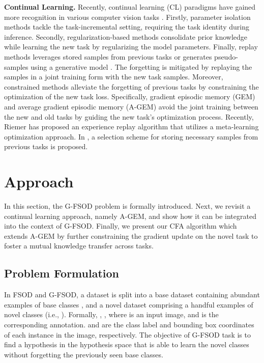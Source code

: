 \documentclass[10pt,twocolumn,letterpaper]{article}
\begin{document}
\textbf{Continual Learning.} Recently, continual learning (CL) paradigms have gained more recognition in various computer vision tasks \cite{cl_survey}. Firstly, parameter isolation methods \cite{packnet, piggyback, hat, expert_gate, rcl, dan} tackle the task-incremental setting, requiring the task identity during inference. Secondly, regularization-based methods \cite{ewc, lwf, si, lfl, ebll, dmc} consolidate prior knowledge while learning the new task by regularizing the model parameters. Finally, replay methods \cite{iCarl, dgr, er, ser, tem, cope, pr, cclugm, lgm, gem, agem, MER, gss} leverages stored samples from previous tasks \cite{iCarl} or generates pseudo-samples using a generative model \cite{dgr}. The forgetting is mitigated by replaying the samples in a joint training form with the new task samples. Moreover, constrained methods \cite{gem, agem, MER, gss} alleviate the forgetting of previous tasks by constraining the optimization of the new task loss. Specifically, gradient episodic memory (GEM) \cite{gem} and average gradient episodic memory (A-GEM) \cite{agem} avoid the joint training between the new and old tasks by guiding the new task's optimization process. Recently, Riemer \etal \cite{MER} has proposed an experience replay algorithm that utilizes a meta-learning optimization approach. In \cite{gss}, a selection scheme for storing necessary samples from previous tasks is proposed. 


\section{Approach}
In this section, the G-FSOD problem is formally introduced. Next, we revisit a continual learning approach, namely A-GEM\cite{agem}, and show how it can be integrated into the context of G-FSOD. Finally, we present our CFA algorithm which extends A-GEM by further constraining the gradient update on the novel task to foster a mutual knowledge transfer across tasks.   

\subsection{Problem Formulation}
In FSOD and G-FSOD, a dataset is split into a base dataset  containing abundant examples of base classes , and a novel dataset  comprising a handful examples of novel classes  (i.e., ). Formally, , , where  is an input image, and   is the corresponding annotation.  and  are  the class label and bounding box coordinates of each instance  in the image, respectively. The objective of G-FSOD task is to find a hypothesis  in the hypothesis space that is able to learn the novel classes without forgetting the previously seen base classes.
\end{document}
